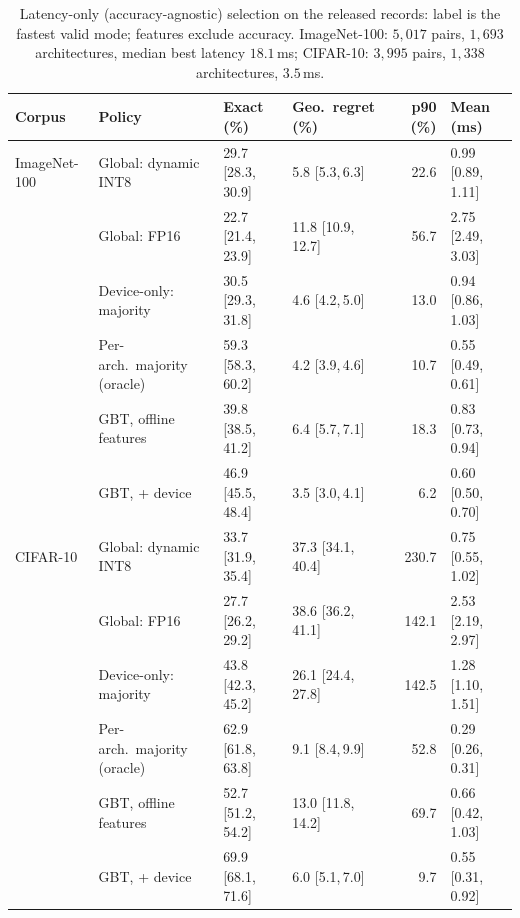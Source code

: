 \begin{table}[!htbp]
\centering
\caption{Latency-only (accuracy-agnostic) selection on the released records:
label is the fastest valid mode; features exclude accuracy. ImageNet-100:
$5{,}017$ pairs, $1{,}693$ architectures, median best latency $18.1$\,ms;
CIFAR-10: $3{,}995$ pairs, $1{,}338$ architectures, $3.5$\,ms.}
\label{tab:latonly}
\footnotesize
\setlength{\tabcolsep}{3.5pt}
\begin{tabular}{@{}llllrl@{}}
\toprule
\textbf{Corpus} & \textbf{Policy} & \textbf{Exact (\%)} & \textbf{Geo.\ regret (\%)} & \textbf{p90 (\%)} & \textbf{Mean (ms)}\\
\midrule
ImageNet-100 & Global: dynamic INT8 & 29.7 [28.3,\,30.9] & 5.8 [5.3,\,6.3] & 22.6 & 0.99 [0.89,\,1.11] \\
 & Global: FP16 & 22.7 [21.4,\,23.9] & 11.8 [10.9,\,12.7] & 56.7 & 2.75 [2.49,\,3.03] \\
 & Device-only: majority & 30.5 [29.3,\,31.8] & 4.6 [4.2,\,5.0] & 13.0 & 0.94 [0.86,\,1.03] \\
 & Per-arch.\ majority (oracle) & 59.3 [58.3,\,60.2] & 4.2 [3.9,\,4.6] & 10.7 & 0.55 [0.49,\,0.61] \\
 & GBT, offline features & 39.8 [38.5,\,41.2] & 6.4 [5.7,\,7.1] & 18.3 & 0.83 [0.73,\,0.94] \\
 & GBT, + device & 46.9 [45.5,\,48.4] & 3.5 [3.0,\,4.1] & 6.2 & 0.60 [0.50,\,0.70] \\
\midrule
CIFAR-10 & Global: dynamic INT8 & 33.7 [31.9,\,35.4] & 37.3 [34.1,\,40.4] & 230.7 & 0.75 [0.55,\,1.02] \\
 & Global: FP16 & 27.7 [26.2,\,29.2] & 38.6 [36.2,\,41.1] & 142.1 & 2.53 [2.19,\,2.97] \\
 & Device-only: majority & 43.8 [42.3,\,45.2] & 26.1 [24.4,\,27.8] & 142.5 & 1.28 [1.10,\,1.51] \\
 & Per-arch.\ majority (oracle) & 62.9 [61.8,\,63.8] & 9.1 [8.4,\,9.9] & 52.8 & 0.29 [0.26,\,0.31] \\
 & GBT, offline features & 52.7 [51.2,\,54.2] & 13.0 [11.8,\,14.2] & 69.7 & 0.66 [0.42,\,1.03] \\
 & GBT, + device & 69.9 [68.1,\,71.6] & 6.0 [5.1,\,7.0] & 9.7 & 0.55 [0.31,\,0.92] \\
\bottomrule
\end{tabular}
\end{table}

